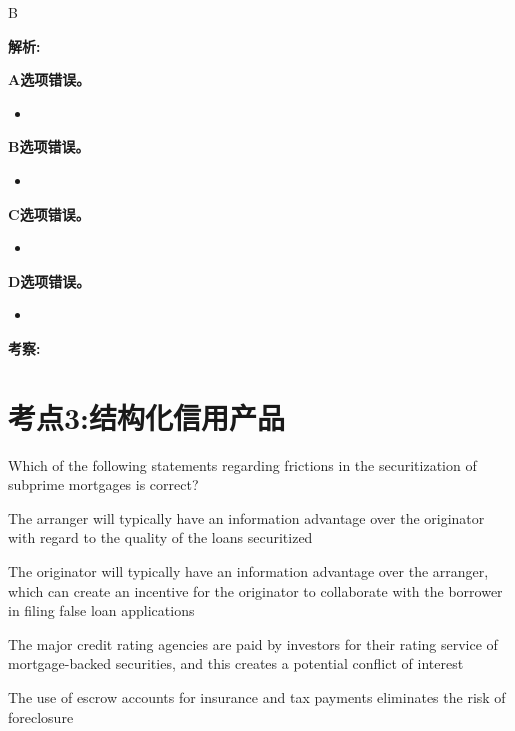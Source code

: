 \documentclass{article}
\newcounter{question} %
\newenvironment{explanation}
{\textbf{解析:}\par}
{\par}
\newcommand{\checklist}[1]{
    \textbf{考察:} #1 \par %
    \addcontentsline{toc}{subsection}{题号\thequestion 考察: #1} %
    \vspace{2em} %
}
\begin{document}
\begin{choices}
    \item 
\end{choices}

\begin{correctanswer}
    B
\end{correctanswer}

\begin{explanation}
    \textbf{A选项错误。}
    \begin{itemize}
        \item 
    \end{itemize}
    \textbf{B选项错误。}
    \begin{itemize}
        \item 
    \end{itemize}
    \textbf{C选项错误。}
    \begin{itemize}
        \item 
    \end{itemize}
    \textbf{D选项错误。}
    \begin{itemize}
        \item 
    \end{itemize}
\end{explanation}
\checklist{}




\newpage


\section{考点3:结构化信用产品}
\setcounter{question}{0}
\begin{question}
    Which of the following statements regarding frictions in the securitization of subprime mortgages is correct?
\end{question}

\begin{choices}
    \item The arranger will typically have an information advantage over the originator with regard to the quality of the loans securitized
    \item The originator will typically have an information advantage over the arranger, which can create an incentive for the originator to collaborate with the borrower in filing false loan applications
    \item The major credit rating agencies are paid by investors for their rating service of mortgage-backed securities, and this creates a potential conflict of interest
    \item The use of escrow accounts for insurance and tax payments eliminates the risk of foreclosure
\end{choices}
\end{document}
